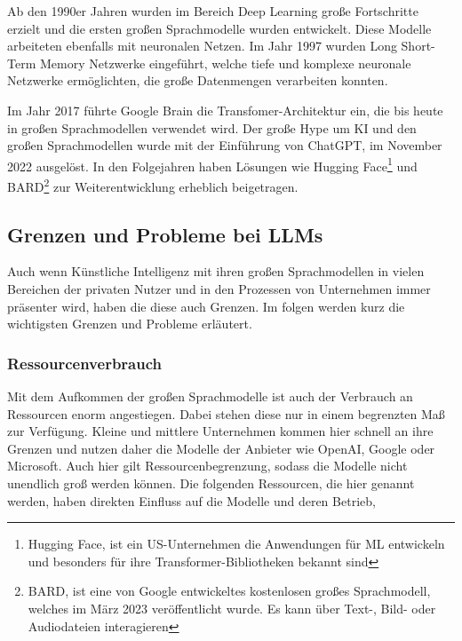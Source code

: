 Ab den 1990er Jahren wurden im Bereich Deep Learning große Fortschritte erzielt und die ersten großen Sprachmodelle wurden entwickelt. Diese Modelle arbeiteten ebenfalls mit neuronalen Netzen. Im Jahr 1997 wurden Long Short-Term Memory Netzwerke eingeführt, welche tiefe und komplexe neuronale Netzwerke ermöglichten, die große Datenmengen verarbeiten konnten.\vspace{0.2cm}

Im Jahr 2017 führte Google Brain die Transfomer-Architektur ein, die bis heute in großen Sprachmodellen verwendet wird. Der große Hype um KI und den großen Sprachmodellen wurde mit der Einführung von ChatGPT, im November 2022 ausgelöst. In den Folgejahren haben Lösungen wie Hugging Face\footnote{Hugging Face, ist ein US-Unternehmen die Anwendungen für ML entwickeln und besonders für ihre Transformer-Bibliotheken bekannt sind} und BARD\footnote{BARD, ist eine von Google entwickeltes kostenlosen großes Sprachmodell, welches im März 2023 veröffentlicht wurde. Es kann über Text-, Bild- oder Audiodateien interagieren} zur Weiterentwicklung erheblich beigetragen.


\subsection{Grenzen und Probleme bei LLMs}
Auch wenn Künstliche Intelligenz mit ihren großen Sprachmodellen in vielen Bereichen der privaten Nutzer und in den Prozessen von Unternehmen immer präsenter wird, haben die diese auch Grenzen. Im folgen werden kurz die wichtigsten Grenzen und Probleme erläutert.



\subsubsection{Ressourcenverbrauch}
Mit  dem Aufkommen der großen Sprachmodelle ist auch der Verbrauch an Ressourcen enorm angestiegen. Dabei stehen diese nur in einem begrenzten Maß zur Verfügung. Kleine und mittlere Unternehmen kommen hier schnell an ihre Grenzen und nutzen daher die Modelle der Anbieter wie OpenAI, Google oder Microsoft. Auch hier gilt Ressourcenbegrenzung, sodass die Modelle nicht unendlich groß werden können. Die folgenden Ressourcen, die hier genannt werden, haben direkten Einfluss auf die Modelle und deren Betrieb,

